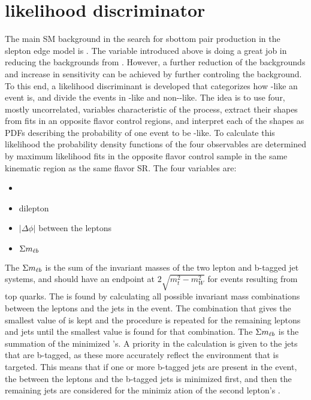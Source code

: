\section{\ttbar likelihood discriminator}\label{sec:ttbarlikelihood}
\noindent\justify
The main SM background in the search for sbottom pair production in the slepton edge model is \ttbar. 
The \mttwo variable introduced above is doing a great job in reducing the backgrounds from \ttbar. 
However, a further reduction of the backgrounds and increase in sensitivity can be achieved by further controling the \ttbar background. 
To this end, a likelihood discriminant is developed that categorizes how \ttbar-like an event is, and divide the events in \ttbar-like and non-\ttbar-like.
\newpara
\noindent\justify
The idea is to use four, mostly uncorrelated, variables characteristic of the \ttbar process, extract their shapes from fits in an opposite flavor control regions, and interpret each of the shapes as PDFs describing the probability of one event to be \ttbar-like. 
To calculate this likelihood the probability density functions of the four observables are determined by maximum likelihood fits in the opposite flavor control sample in the same kinematic region as the same flavor SR. 
The four variables are:
\begin{itemize}
\item \ptmiss
\item dilepton \pt
\item $|\Delta\phi|$ between the leptons
\item $\Sigma m_{\ell b}$
\end{itemize}
\newpara
\noindent\justify
The $\Sigma m_{\ell b}$ is the sum of the invariant masses of the two lepton and b-tagged jet systems, and should have an endpoint at $2\sqrt{m_{t}^{2}-m_{W}^{2}}$ for events resulting from top quarks.
The \mlb is found by calculating all possible invariant mass combinations between the leptons and the jets in the event.
The combination that gives the smallest value of \mlb is kept and the procedure is repeated for the remaining leptons and jets until the smallest value is found for that combination.
The $\Sigma m_{\ell b}$ is the summation of the minimized \mlb's.
A priority in the calculation is given to the jets that are b-tagged, as these more accurately reflect the \ttbar environment that is targeted.
This means that if one or more b-tagged jets are present in the event, the \mlb between the leptons and the b-tagged jets is minimized first, and then the remaining jets are considered for the minimiz    ation of the second lepton’s \mlb.
